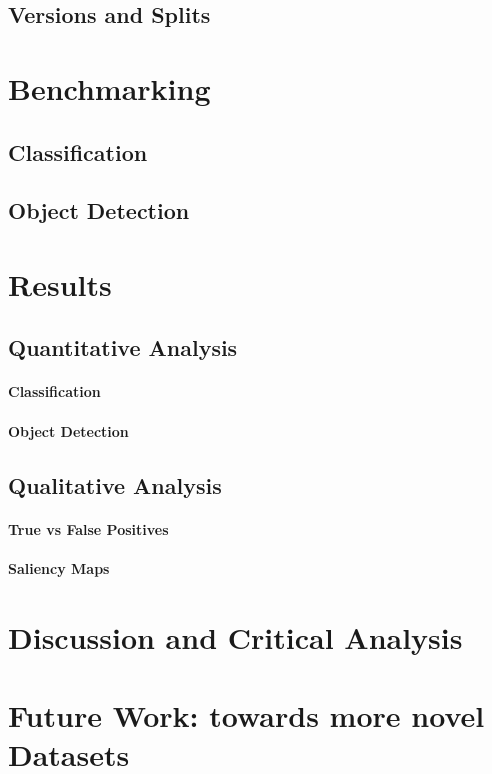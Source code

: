 \subsection{Versions and Splits}


\section{Benchmarking}
\label{sec:benchmarking}

\subsection{Classification}
\subsection{Object Detection}


\section{Results}
\label{sec:results}

\subsection{Quantitative Analysis}
\paragraph{Classification}
\paragraph{Object Detection}

\subsection{Qualitative Analysis}
\paragraph{True vs False Positives}
\paragraph{Saliency Maps}


\section{Discussion and Critical Analysis}
\label{sec:discussion}


\section{Future Work: towards more novel Datasets}
\label{sec:future_work}

